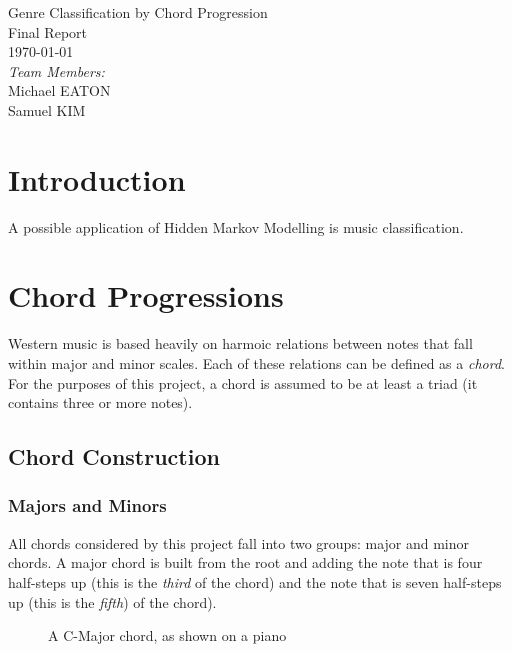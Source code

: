 ﻿\documentclass{article}
\begin{document}
\fancyhf{}
\rhead{\today}

\begin{titlepage}
\begin{center}
{\huge Genre Classification by Chord Progression}\\[2cm]
{\Large Final Report}\\[2cm]
{\large \today}\\[2cm]
\emph{Team Members:}\\
Michael \uppercase{Eaton}\\
Samuel \uppercase{Kim}\\
\end{center}
\end{titlepage}

\tableofcontents
\newpage

\section{Introduction}
A possible application of Hidden Markov Modelling is music classification.  

\newpage

\section{Chord Progressions}
Western music is based heavily on harmoic relations between notes 
that fall within major and minor scales. Each of these relations can be 
defined as a \emph{chord}.  For the purposes of this project, a chord 
is assumed to be at least a triad (it contains three or more notes).

	\subsection{Chord Construction}
	
		\subsubsection{Majors and Minors}
		All chords considered by this project fall into two groups:  major 
		and minor chords.  A major chord is built from the root and adding 
		the note that is four half-steps up (this is the \emph{third} of the 
		chord) and the note that is seven half-steps up (this is the \emph{fifth}) 
		of the chord).

		\begin{figure}[htb]
		\caption{A  C-Major chord, as shown on a piano}
		\end{figure} 
\end{document}
